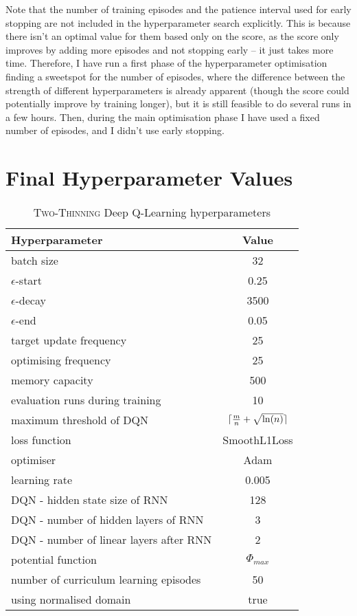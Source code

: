 Note that the number of training episodes and the patience interval used for early stopping are not included in the hyperparameter search explicitly. This is because there isn't an optimal value for them based only on the score, as the score only improves by adding more episodes and not stopping early -- it just takes more time. Therefore, I have run a first phase of the hyperparameter optimisation finding a sweetspot for the number of episodes, where the difference between the strength of different hyperparameters is already apparent (though the score could potentially improve by training longer), but it is still feasible to do several runs in a few hours. Then, during the main optimisation phase I have used a fixed number of episodes, and I didn't use early stopping.


\section{Final Hyperparameter Values}



\begin{table}[h]
\begin{threeparttable}
\centering
\begin{tabular}{l|c}
\toprule
Hyperparameter             &     Value \\
\midrule
batch size               &     32 \\ 
$\epsilon$-start               &    0.25 \\ 
$\epsilon$-decay         &     3500\\
$\epsilon$-end              &     0.05 \\
target update frequency               &     25 \\ 
optimising frequency          &     25 \\ 
memory capacity     &     500 \\
evaluation runs during training             &     10 \\
maximum threshold of DQN             &     $\lceil\frac{m}{n}+\sqrt{\ln(n)}\rceil$ \\ 
loss function               &     SmoothL1Loss \\ 
optimiser        &     Adam \\
learning rate             &     0.005 \\
DQN - hidden state size of RNN               &     128 \\ 
DQN - number of hidden layers of RNN         &     3 \\ 
DQN - number of linear layers after RNN     &     2 \\
potential function            &    $\Phi_{max}$ \\
number of curriculum learning episodes            & 50 \\ 
using normalised domain               &     true \\ 
\bottomrule
\end{tabular}
\end{threeparttable}
\caption{\textsc{Two-Thinning} Deep Q-Learning hyperparameters\protect\footnotemark}
\label{tab:two-thinning-hyperparameters}
\end{table}

